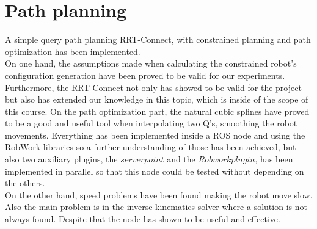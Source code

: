 \section{Path planning}
A simple query path planning RRT-Connect, with constrained planning and path optimization has been implemented. \\

On one hand, the assumptions made when calculating the constrained robot's configuration generation have been proved to be valid for our experiments. 
Furthermore, the RRT-Connect not only has showed to be valid for the project but also has extended our knowledge in this topic, which is inside of the scope of this course.
On the path optimization part, the natural cubic splines have proved to be a good and useful tool when interpolating two Q's, smoothing the robot movements. Everything has been implemented inside a ROS node and using the RobWork libraries so a further understanding of those has been achieved, but also two auxiliary plugins, the $server point$ and the $Robwork plugin$, has been implemented in parallel so that this node could be tested without depending on the others.\\

On the other hand, speed problems have been found making the robot move slow. Also the main problem is in the inverse kinematics solver where a solution is not always found. Despite that the node has shown to be useful and effective.


